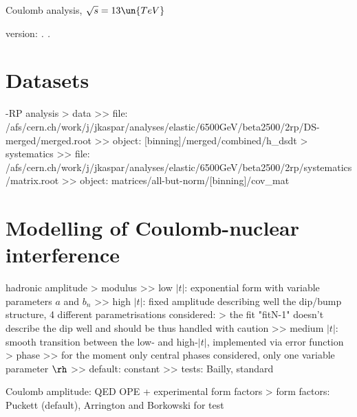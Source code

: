 

\def\baseDir{/afs/cern.ch/work/j/jkaspar/analyses/elastic/6500GeV/combined/coulomb_analysis_1}


\hbox{}
\vskip-10mm

\centerline{\SetFontSizesXX Coulomb analysis, $\sqrt s = 13\un{TeV}$}
\vskip2mm
\centerline{version: {\it \number\day. \number\month. \number\year}}

\vfil
\InsertToc

\vfil
\eject

\BeginText

\chapter[datasets]{Datasets}

-RP analysis
\>> data
\>>> file: /afs/cern.ch/work/j/jkaspar/analyses/elastic/6500GeV/beta2500/2rp/DS-merged/merged.root
\>>> object: [binning]/merged/combined/h\_dsdt
\>> systematics
\>>> file: /afs/cern.ch/work/j/jkaspar/analyses/elastic/6500GeV/beta2500/2rp/systematics/matrix.root
\>>> object: matrices/all-but-norm/[binning]/cov\_mat


\chapter[modelling]{Modelling of Coulomb-nuclear interference}

\> hadronic amplitude
\>> modulus
\>>> low $|t|$: exponential form with variable parameters $a$ and $b_n$
\>>> high $|t|$: fixed amplitude describing well the dip/bump structure, 4 different parametrisations considered: 
\>> the fit "fitN-1" doesn't describe the dip well and should be thus handled with caution
\>>> medium $|t|$: smooth transition between the low- and high-$|t|$, implemented via error function
\>> phase
\>>> for the moment only central phases considered, only one variable parameter $\rh$
\>>> default: constant
\>>> tests: Bailly, standard

\> Coulomb amplitude: QED OPE + experimental form factors
\>> form factors: Puckett (default), Arrington and Borkowski for test


